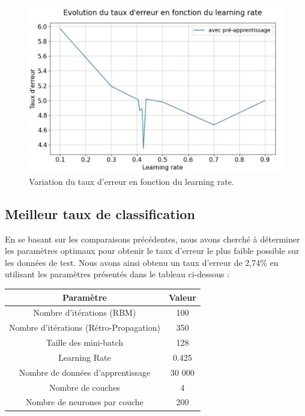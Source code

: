 \begin{figure}[H]\includegraphics[width=140mm]
{images/graph3.png}
\caption{Variation du taux d'erreur en fonction du learning rate.}
\end{figure}

\subsection{Meilleur taux de classification}
En se basant sur les comparaisons précédentes, nous avons cherché à déterminer les paramètres optimaux pour obtenir le taux d'erreur le plus faible possible sur les données de test. Nous avons ainsi obtenu un taux d'erreur de 2,74\% en utilisant les paramètres présentés dans le tableau ci-dessous :


\begin{table}[h!]
\centering
\begin{tabular}{|c|c|}
\hline
Paramètre & Valeur \\
\hline
Nombre d’itérations (RBM)  & 100 \\
Nombre d’itérations (Rétro-Propagation) & 350  \\
Taille des mini-batch & 128 \\
Learning Rate & 0.425  \\
Nombre de données d’apprentissage & 30 000  \\
Nombre de couches & 4  \\
Nombre de neurones par couche & 200  \\
\hline
\end{tabular}
\end{table}
